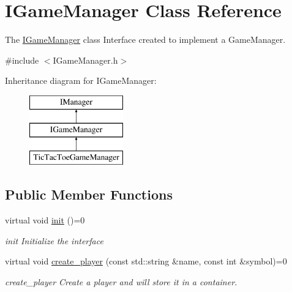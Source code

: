 \hypertarget{class_i_game_manager}{}\section{I\+Game\+Manager Class Reference}
\label{class_i_game_manager}


The \hyperlink{class_i_game_manager}{I\+Game\+Manager} class Interface created to implement a Game\+Manager.  




{\ttfamily \#include $<$I\+Game\+Manager.\+h$>$}

Inheritance diagram for I\+Game\+Manager\+:\begin{figure}[H]
\begin{center}
\leavevmode
\includegraphics[height=3.000000cm]{class_i_game_manager}
\end{center}
\end{figure}
\subsection*{Public Member Functions}
\begin{DoxyCompactItemize}
\item 
\mbox{\label{class_i_game_manager_a355e2344fc289700bfa0aab3ba32d1e8}} 
virtual void \hyperlink{class_i_game_manager_a355e2344fc289700bfa0aab3ba32d1e8}{init} ()=0
\begin{DoxyCompactList}\small\item\em init Initialize the interface \end{DoxyCompactList}\item 
virtual void \hyperlink{class_i_game_manager_a197ed85a1deadeb414b3030e11d0bf1e}{create\+\_\+player} (const std\+::string \&name, const int \&symbol)=0
\begin{DoxyCompactList}\small\item\em create\+\_\+player Create a player and will store it in a container. \end{DoxyCompactList}\end{DoxyCompactItemize}



